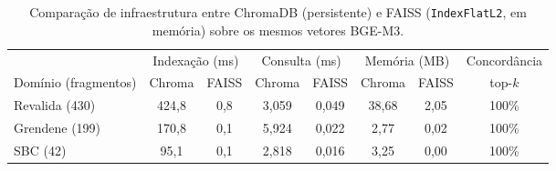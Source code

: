 \begin{table}[!t]
\centering
\footnotesize
\setlength{\tabcolsep}{4pt}
\caption{Comparação de infraestrutura entre ChromaDB (persistente) e FAISS (\texttt{IndexFlatL2}, em memória) sobre os mesmos vetores BGE-M3.}
\label{tab:vectorstores}
\begin{tabular}{lccccccc}
\toprule
& \multicolumn{2}{c}{Indexação (ms)} & \multicolumn{2}{c}{Consulta (ms)} & \multicolumn{2}{c}{Memória (MB)} & Concordância \\ \cmidrule(lr){2-3} \cmidrule(lr){4-5} \cmidrule(lr){6-7}
Domínio (fragmentos) & Chroma & FAISS & Chroma & FAISS & Chroma & FAISS & top-$k$ \\
\midrule
Revalida (430) & 424,8 & 0,8 & 3,059 & 0,049 & 38,68 & 2,05 & 100\% \\
Grendene (199) & 170,8 & 0,1 & 5,924 & 0,022 & 2,77 & 0,02 & 100\% \\
SBC (42) & 95,1 & 0,1 & 2,818 & 0,016 & 3,25 & 0,00 & 100\% \\
\bottomrule
\end{tabular}
\end{table}
